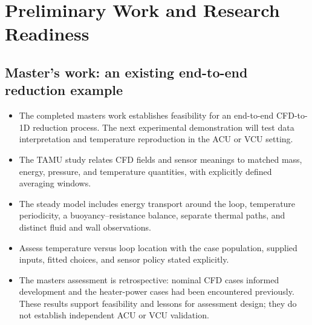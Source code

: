 \section{Preliminary Work and Research Readiness}\label{sec:preliminary-work-and-research-readiness}

\subsection{Master's work: an existing end-to-end reduction example}\label{subsec:master-s-work-an-existing-end-to-end-reduction-example}

\begin{itemize}[leftmargin=*]
\item The completed master\textquotesingle{}s work establishes feasibility for an end-to-end CFD-to-1D reduction process. The next experimental demonstration will test data interpretation and temperature reproduction in the ACU or VCU setting.\cite{fierro2026cfdoneD}
\item The TAMU study relates CFD fields and sensor meanings to matched mass, energy, pressure, and temperature quantities, with explicitly defined averaging windows.\cite{fierro2026cfdoneD}
\item The steady model includes energy transport around the loop, temperature periodicity, a buoyancy--resistance balance, separate thermal paths, and distinct fluid and wall observations.
\item Assess temperature versus loop location with the case population, supplied inputs, fitted choices, and sensor policy stated explicitly.
\item The master\textquotesingle{}s assessment is retrospective: nominal CFD cases informed development and the heater-power cases had been encountered previously. These results support feasibility and lessons for assessment design; they do not establish independent ACU or VCU validation.
\end{itemize}

